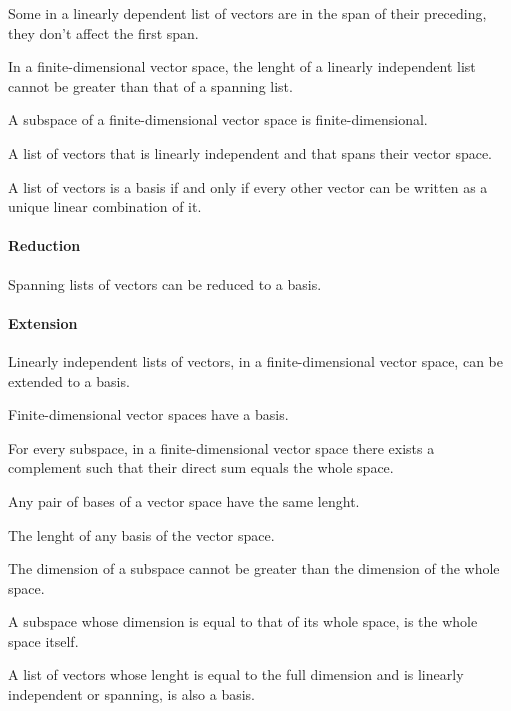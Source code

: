 \begin{multicols}{3}
  Some in a linearly dependent list of vectors are in the span of their preceding, they don't affect the first span.
  
  In a finite-dimensional vector space, the lenght of a linearly independent list cannot be greater than that of a spanning list.
  
  A subspace of a finite-dimensional vector space is finite-dimensional.
  
  A list of vectors that is linearly independent and that spans their vector space.
  
  A list of vectors is a basis if and only if every other vector can be written as a unique linear combination of it.
  
  \paragraph{\textbf{Reduction}}
  Spanning lists of vectors can be reduced to a basis.
  \paragraph{\textbf{Extension}}
  Linearly independent lists of vectors, in a finite-dimensional vector space, can be extended to a basis.

  Finite-dimensional vector spaces have a basis.
  
  For every subspace, in a finite-dimensional vector space there exists a complement such that their direct sum equals the whole space.
  
  Any pair of bases of a vector space have the same lenght.
  
  The lenght of any basis of the vector space.
  
  The dimension of a subspace cannot be greater than the dimension of the whole space.
  
  A subspace whose dimension is equal to that of its whole space, is the whole space itself.
  
  A list of vectors whose lenght is equal to the full dimension and is linearly independent or spanning, is also a basis.
  

\end{multicols}
